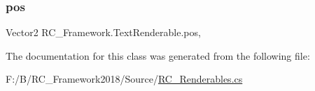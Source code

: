 \subsubsection{\texorpdfstring{pos}{pos}}
{\footnotesize\ttfamily Vector2 R\+C\+\_\+\+Framework.\+Text\+Renderable.\+pos\hspace{0.3cm}{\ttfamily [get]}, {\ttfamily [set]}}



The documentation for this class was generated from the following file\+:\begin{DoxyCompactItemize}
\item 
F\+:/\+B/\+R\+C\+\_\+\+Framework2018/\+Source/\mbox{\hyperlink{_r_c___renderables_8cs}{R\+C\+\_\+\+Renderables.\+cs}}\end{DoxyCompactItemize}
